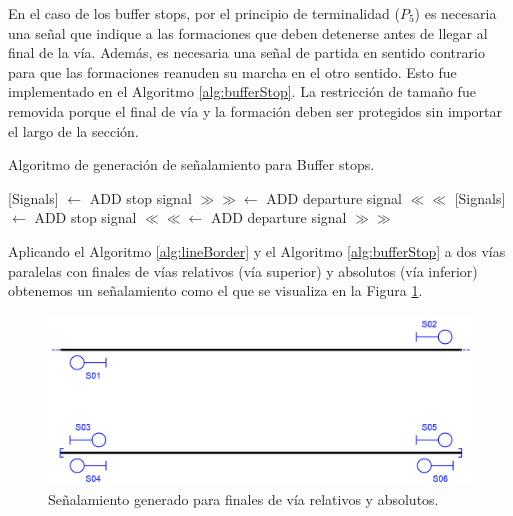     En el caso de los buffer stops, por el principio de terminalidad ($P_5$) es necesaria una señal que indique a las formaciones que deben detenerse antes de llegar al final de la vía. Además, es necesaria una señal de partida en sentido contrario para que las formaciones reanuden su marcha en el otro sentido. Esto fue implementado en el Algoritmo \ref{alg:bufferStop}. La restricción de tamaño fue removida porque el final de vía y la formación deben ser protegidos sin importar el largo de la sección.
    
    \begin{algorithm}[hbt!]
        \caption{Algoritmo de generación de señalamiento para Buffer stops.}\label{alg:bufferStop}
        \DontPrintSemicolon
        \SetNoFillComment
        \LinesNotNumbered 
        {
            {
                [Signals] $\gets$ ADD stop signal $\gg\gg$\;
                [Signals] $\gets$ ADD departure signal $\ll\ll$\;
            }
            {
                [Signals] $\gets$ ADD stop signal $\ll\ll$\;
                [Signals] $\gets$ ADD departure signal $\gg\gg$\;
            }
        }
        \KwResult{[Signals]} 
    \end{algorithm}
    
    Aplicando el Algoritmo \ref{alg:lineBorder} y el Algoritmo \ref{alg:bufferStop} a dos vías paralelas con finales de vías relativos (vía superior) y absolutos (vía inferior) obtenemos un señalamiento como el que se visualiza en la Figura \ref{fig:signal_border}.
    
    \begin{figure}[h!]
        \centering
        \includegraphics[width=1\textwidth]{Figuras/limites.PNG}
        \centering\caption{Señalamiento generado para finales de vía relativos y absolutos.}
        \label{fig:signal_border}
    \end{figure}
    
